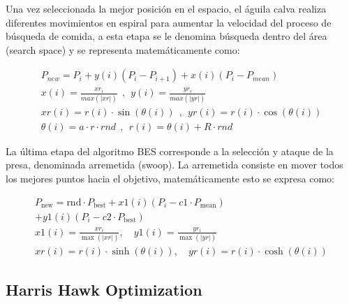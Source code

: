 \documentclass[conference]{IEEEtran}
\begin{document}
\noindent Una vez seleccionada la mejor posición en el espacio, el águila calva realiza diferentes movimientos en espiral para aumentar la velocidad del proceso de búsqueda de comida, a esta etapa se le denomina búsqueda dentro del área (search space) y se representa matemáticamente como:

\begin{equation}
	\begin{gathered}
		P_{new}=P_{i}+y(i)(P_{i}-P_{i+1})+x(i)(P_{i}-P_{mean}) \\
		x(i)= \frac{xr_{i}}{max(\lvert xr \rvert)} ~\ , ~\ y(i)= \frac{yr_{i}}{max(\lvert yr \rvert)} \\
		xr(i)=r(i)\cdot \sin (\theta(i)) ~\ , ~\ yr(i)=r(i)\cdot \cos (\theta(i)) \\
		\theta(i)=a\cdot r\cdot rnd ~\ , ~\ r(i)=\theta(i)+R \cdot rnd 
	\end{gathered}
	\label{eq12}
\end{equation}

\noindent La última etapa del algoritmo BES corresponde a la selección y ataque de la presa, denominada arremetida (swoop). La arremetida consiste en mover todos los mejores puntos hacia el objetivo, matemáticamente esto se expresa como:

\begin{equation}
	\begin{gathered}
		P_{\text{new}} = \text{rnd} \cdot P_{\text{best}} + x1(i)(P_{i}-c1 \cdot P_{\text{mean}}) \\
		+ y1(i)(P_{i}-c2 \cdot P_{\text{best}}) \\
		x1(i) = \frac{xr_{i}}{\max(\lvert xr \rvert)}, \quad y1(i) = \frac{yr_{i}}{\max(\lvert yr \rvert)} \\
		xr(i) = r(i) \cdot \sinh(\theta(i)), \quad yr(i) = r(i) \cdot \cosh(\theta(i))
	\end{gathered}
	\label{eq13}
\end{equation}


\subsection{Harris Hawk Optimization}
\end{document}
